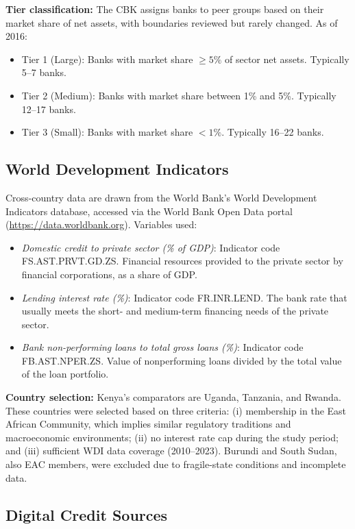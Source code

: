 \documentclass[12pt]{article}
\begin{document}
\textbf{Tier classification:} The CBK assigns banks to peer groups based on their market share of net assets, with boundaries reviewed but rarely changed. As of 2016:
\begin{itemize}
    \item Tier 1 (Large): Banks with market share $\geq 5\%$ of sector net assets. Typically 5--7 banks.
    \item Tier 2 (Medium): Banks with market share between 1\% and 5\%. Typically 12--17 banks.
    \item Tier 3 (Small): Banks with market share $< 1\%$. Typically 16--22 banks.
\end{itemize}

\subsection{World Development Indicators}

Cross-country data are drawn from the World Bank's World Development Indicators database, accessed via the World Bank Open Data portal (\url{https://data.worldbank.org}). Variables used:

\begin{itemize}
    \item \textit{Domestic credit to private sector (\% of GDP)}: Indicator code FS.AST.PRVT.GD.ZS. Financial resources provided to the private sector by financial corporations, as a share of GDP.
    \item \textit{Lending interest rate (\%)}: Indicator code FR.INR.LEND. The bank rate that usually meets the short- and medium-term financing needs of the private sector.
    \item \textit{Bank non-performing loans to total gross loans (\%)}: Indicator code FB.AST.NPER.ZS. Value of nonperforming loans divided by the total value of the loan portfolio.
\end{itemize}

\textbf{Country selection:} Kenya's comparators are Uganda, Tanzania, and Rwanda. These countries were selected based on three criteria: (i) membership in the East African Community, which implies similar regulatory traditions and macroeconomic environments; (ii) no interest rate cap during the study period; and (iii) sufficient WDI data coverage (2010--2023). Burundi and South Sudan, also EAC members, were excluded due to fragile-state conditions and incomplete data.

\subsection{Digital Credit Sources}
\end{document}
